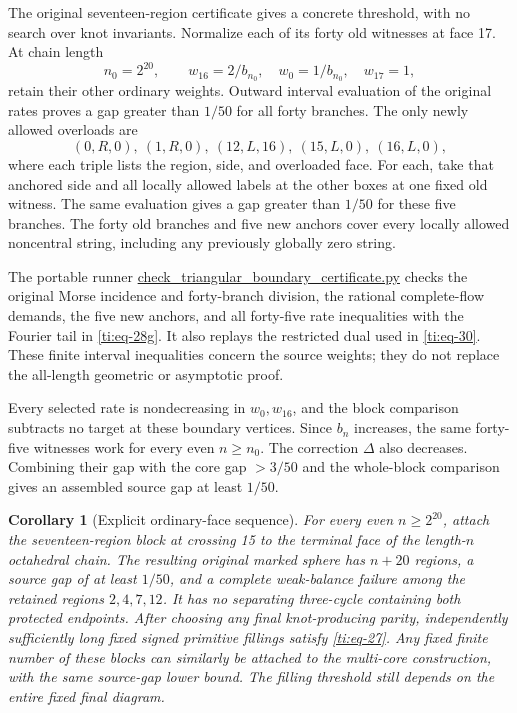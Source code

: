 \documentclass[11pt]{article}
\numberwithin{equation}{section}
\newtheorem{corollary}[theorem]{Corollary}
\theoremstyle{definition}\newtheorem{definition}[theorem]{Definition}
\theoremstyle{remark}\newtheorem{remark}[theorem]{Remark}
\begin{document}
The original seventeen-region certificate gives a concrete threshold, with no search over knot invariants. Normalize each of its forty old witnesses at face 17. At chain length
\begin{equation}\label{ti:eq-35}
n_0=2^{20},\qquad
w_{16}=2/b_{n_0},\quad w_0=1/b_{n_0},\quad w_{17}=1,
\end{equation}
retain their other ordinary weights. Outward interval evaluation of the original rates proves a gap greater than \(1/50\) for all forty branches. The only newly allowed overloads are
\begin{equation}\label{ti:eq-36}
(0,R,0),\ (1,R,0),\ (12,L,16),\ (15,L,0),\ (16,L,0),
\end{equation}
where each triple lists the region, side, and overloaded face. For each, take that anchored side and all locally allowed labels at the other boxes at one fixed old witness. The same evaluation gives a gap greater than \(1/50\) for these five branches. The forty old branches and five new anchors cover every locally allowed noncentral string, including any previously globally zero string.

The portable runner \href{https://github.com/sashakolpakov/murakamis_dream/blob/main/repro/check_triangular_boundary_certificate.py}{check\_triangular\_boundary\_certificate.py} checks the original Morse incidence and forty-branch division, the rational complete-flow demands, the five new anchors, and all forty-five rate inequalities with the Fourier tail in \eqref{ti:eq-28g}. It also replays the restricted dual used in \eqref{ti:eq-30}. These finite interval inequalities concern the source weights; they do not replace the all-length geometric or asymptotic proof.

Every selected rate is nondecreasing in \(w_0,w_{16}\), and the block comparison subtracts no target at these boundary vertices. Since \(b_n\) increases, the same forty-five witnesses work for every even \(n\ge n_0\). The correction \(\Delta\) also decreases. Combining their gap with the core gap \(>3/50\) and the whole-block comparison gives an assembled source gap at least \(1/50\).

\begin{corollary}[Explicit ordinary-face sequence]\label{ti:explicit} For every even \(n\ge2^{20}\), attach the seventeen-region block at crossing 15 to the terminal face of the length-\(n\) octahedral chain. The resulting original marked sphere has \(n+20\) regions, a source gap of at least \(1/50\), and a complete weak-balance failure among the retained regions \(2,4,7,12\). It has no separating three-cycle containing both protected endpoints. After choosing any final knot-producing parity, independently sufficiently long fixed signed primitive fillings satisfy \eqref{ti:eq-27}. Any fixed finite number of these blocks can similarly be attached to the multi-core construction, with the same source-gap lower bound. The filling threshold still depends on the entire fixed final diagram.
\end{corollary}
\end{document}
